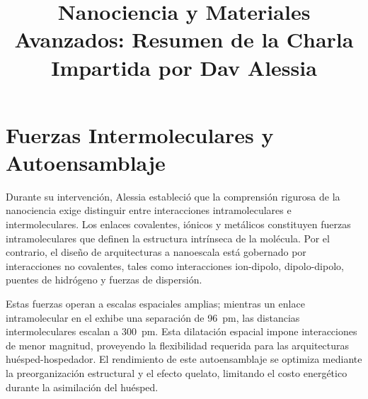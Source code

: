 \documentclass[pdflatex,sn-mathphys-num]{sn-jnl}
\theoremstyle{thmstyleone}%
\theoremstyle{thmstyletwo}%
\theoremstyle{thmstylethree}%
\begin{document}
\title[Resumen de Charla Nanociencia]{Nanociencia y Materiales
Avanzados: Resumen de la Charla Impartida por Dav Alessia}

\author{
}




\maketitle

\section{Fuerzas Intermoleculares y Autoensamblaje}
\label{sec:fuerzas}

Durante su intervención, Alessia estableció que la comprensión rigurosa de
la nanociencia exige distinguir entre interacciones intramoleculares e
intermoleculares. Los enlaces covalentes, iónicos y metálicos
constituyen fuerzas intramoleculares que definen la estructura intrínseca de
la molécula. Por el contrario, el diseño de arquitecturas a
nanoescala está gobernado por interacciones no covalentes, tales como
interacciones ion-dipolo, dipolo-dipolo, puentes de hidrógeno y fuerzas de
dispersión.

Estas fuerzas operan a escalas espaciales amplias; mientras un enlace
intramolecular en el  exhibe una separación de
\qty{96}{\pico\meter}, las distancias intermoleculares escalan a
\qty{300}{\pico\meter}. Esta dilatación espacial impone
interacciones de menor magnitud, proveyendo la flexibilidad requerida para
las arquitecturas huésped-hospedador. El rendimiento de este
autoensamblaje se optimiza mediante la preorganización estructural y el
efecto quelato, limitando el costo energético durante la asimilación del
huésped.
\end{document}
